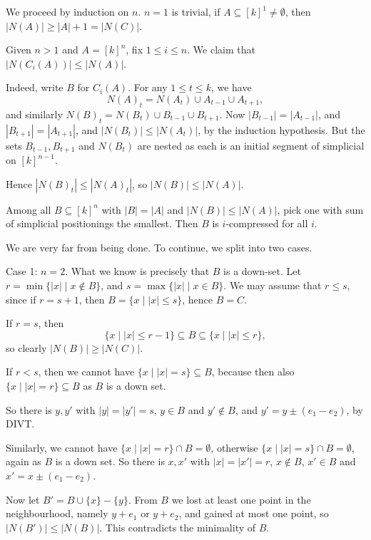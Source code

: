 \documentclass[12pt]{article}
\begin{document}
\begin{proofbox}
	We proceed by induction on $n$. $n = 1$ is trivial, if $A \subseteq [k]^{1} \neq \emptyset$, then $|N(A)| \geq |A| + 1 = |N(C)|$.

	Given $n > 1$ and $A = [k]^{n}$, fix $1 \leq i \leq n$. We claim that $|N(C_i(A))| \leq |N(A)|$.

	Indeed, write $B$ for $C_i(A)$. For any $1 \leq t \leq k$, we have
	\[
	N(A)_t = N(A_t) \cup A_{t-1} \cup A_{t+1},
	\]
	and similarly $N(B)_t = N(B_t) \cup B_{t-1} \cup B_{t+1}$. Now $|B_{t-1}| = |A_{t-1}|$, and $|B_{t+1}| = |A_{t+1}|$, and $|N(B_t)| \leq |N(A_t)|$, by the induction hypothesis. But the sets $B_{t-1}, B_{t+1}$ and $N(B_t)$ are nested as each is an initial segment of simplicial on $[k]^{n-1}$.

	Hence $|N(B)_t| \leq |N(A)_t|$, so $|N(B)| \leq |N(A)|$.

	Among all $B \subseteq [k]^{n}$ with $|B| = |A|$ and $|N(B)| \leq |N(A)|$, pick one with sum of simplicial positionings the smallest. Then $B$ is $i$-compressed for all $i$.

	We are very far from being done. To continue, we split into two cases.

	Case 1: $n = 2$. What we know is precisely that $B$ is a down-set.
	Let $r = \min\{|x| \mid x \not \in B\}$, and $s = \max\{|x| \mid x \in B\}$. We may assume that $r \leq s$, since if $r = s + 1$, then $B = \{x \mid |x| \leq s\}$, hence $B = C$.

	If $r = s$, then
	\[
		\{x \mid |x| \leq r - 1\} \subseteq B \subseteq \{x \mid |x| \leq r\},
	\]
	so clearly $|N(B)| \geq |N(C)|$.

	If  $r < s$, then we cannot have $\{x \mid |x| = s\} \subseteq B$, because then also $\{x \mid |x| = r\} \subseteq B$ as $B$ is a down set.

	So there is $y, y'$ with $|y| = |y'| = s$, $y \in B$ and $y' \not \in B$, and $y' = y \pm (e_1 - e_2)$, by DIVT.

	Similarly, we cannot have $\{x \mid |x| = r\} \cap B = \emptyset$, otherwise $\{x \mid |x| = s\} \cap B = \emptyset$, again as $B$ is a down set. So there is $x, x'$ with $|x| = |x'| = r$, $x \not \in B$, $x' \in B$ and $x' = x \pm (e_1 - e_2)$.

	Now let $B' = B \cup \{x\} - \{y\}$. From $B$ we lost at least one point in the neighbourhood, namely $y + e_1$ or $y + e_2$, and gained at most one point, so $|N(B')| \leq |N(B)|$. This contradicts the minimality of $B$.


\end{proofbox}
\end{document}
